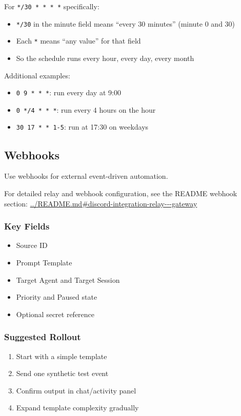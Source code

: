 \documentclass{article}
\begin{document}
For \texttt{*/30 * * * *} specifically:
\begin{itemize}
	\item \texttt{*/30} in the minute field means ``every 30 minutes'' (minute 0 and 30)
	\item Each \texttt{*} means ``any value'' for that field
	\item So the schedule runs every hour, every day, every month
\end{itemize}

Additional examples:
\begin{itemize}
	\item \texttt{0 9 * * *}: run every day at 9:00
	\item \texttt{0 */4 * * *}: run every 4 hours on the hour
	\item \texttt{30 17 * * 1-5}: run at 17:30 on weekdays
\end{itemize}

\subsection{Webhooks}

Use webhooks for external event-driven automation.

For detailed relay and webhook configuration, see the README webhook section:
\url{../README.md#discord-integration-relay---gateway}

\subsubsection{Key Fields}
\begin{itemize}
	\item Source ID
	\item Prompt Template
	\item Target Agent and Target Session
	\item Priority and Paused state
	\item Optional secret reference
\end{itemize}

\subsubsection{Suggested Rollout}
\begin{enumerate}
	\item Start with a simple template
	\item Send one synthetic test event
	\item Confirm output in chat/activity panel
	\item Expand template complexity gradually
\end{enumerate}
\end{document}
